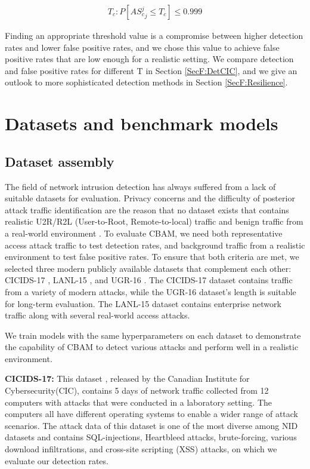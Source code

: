 \begin{align*}
T_{c}:P[{AS_{c}^j}_j \leq T_c ] \leq 0.999
\end{align*}

Finding an appropriate threshold value is a compromise between higher detection rates and lower false positive rates, and we chose this value to achieve false positive rates that are low enough for a realistic setting. We compare detection and false positive rates for different T in Section \ref{SecF:DetCIC}, and we give an outlook to more sophisticated detection methods in Section \ref{SecF:Resilience}.



\section{Datasets and benchmark models}\label{SecF:Datasets}

\subsection{Dataset assembly}\label{SecF:data}

The field of network intrusion detection has always suffered from a lack of suitable datasets for evaluation. Privacy concerns and the difficulty of posterior attack traffic identification are the reason that no dataset exists that contains realistic U2R/R2L (User-to-Root, Remote-to-local) traffic and benign traffic from a real-world environment \cite{ahmed2016survey}. 
To evaluate CBAM, we need both representative access attack traffic to test detection rates, and  background traffic from a realistic environment to test false positive rates. To ensure that both criteria are met, we selected three modern publicly available datasets that complement each other: CICIDS-17 \cite{sharafaldin2018toward}, LANL-15 \cite{akent-2015-enterprise-data,kent-2015-cyberdata1}, and UGR-16 \cite{macia2018ugr}. 
 The CICIDS-17 dataset contains traffic from a variety of modern attacks, while the UGR-16 dataset's length is suitable for long-term evaluation. The LANL-15 dataset contains enterprise network traffic along with several real-world access attacks.
 
 We train models with the same hyperparameters on each dataset to demonstrate the capability of CBAM to detect various attacks and perform well in a realistic environment. 



\textbf{CICIDS-17:}
This dataset \cite{sharafaldin2018toward}, released by the Canadian  Institute  for  Cybersecurity(CIC), contains 5 days of network traffic collected from 12 computers with attacks that were conducted in a laboratory setting. The computers all have different operating systems to enable a wider range of attack scenarios. The  attack  data  of  this  dataset  is  one  of  the  most  diverse  among  NID  datasets and contains SQL-injections, Heartbleed attacks, brute-forcing, various download infiltrations, and cross-site scripting (XSS) attacks, on which we evaluate our detection rates.

